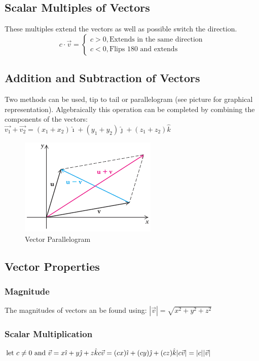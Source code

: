 \documentclass{article}
\begin{document}
    \subsection{Scalar Multiples of Vectors}
    These multiples extend the vectors as well as possible switch the direction.
    \begin{equation}
        c \cdot \vec{v} = \begin{cases}
            c > 0, \text{Extends in the same direction}\\
            c < 0, \text{Flips 180 and extends}
        \end{cases}
    \end{equation}

    \subsection{Addition and Subtraction of Vectors}
    Two methods can be used, tip to tail or parallelogram (see picture for graphical representation).
    Algebraically this operation can be completed by combining the components of the vectors:\\
    $\vec{v_1}+\vec{v_2}=(x_1+x_2)\hat{\imath}+(y_1+y_2)\hat{\jmath}+(z_1+z_2)\hat{k}$
    \begin{figure}[ht]
        \centering
        \includegraphics[scale=.5]{vectorparallelogram.png}
        \caption{Vector Parallelogram}
    \end{figure}

    \subsection{Vector Properties}
        \subsubsection{Magnitude}
        The magnitudes of vectors an be found using: $|\vec{v}|=\sqrt{x^2+y^2+z^2}$
        \subsubsection{Scalar Multiplication}
        $\text{let }c\neq 0\text{ and } \vec{v}=x\hat{\imath}+y\hat{\jmath}+z\hat{k}\\c\vec{v}=(cx)\hat{\imath}+(cy)\hat{\jmath}+(cz)\hat{k}\\|c\vec{v}|=|c||\vec{v}|$
\end{document}
